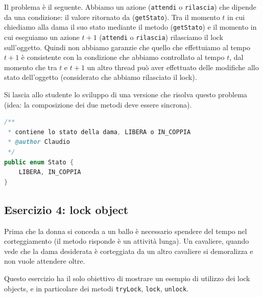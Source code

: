 \documentclass{article}
\begin{document}
Il problema \`e il seguente. Abbiamo un azione (\texttt{attendi} o \texttt{rilascia}) che dipende da una condizione: il valore ritornato da (\texttt{getStato}). Tra il momento $t$ in cui chiediamo alla dama il suo stato mediante il metodo (\texttt{getStato}) e il momento in cui eseguiamo un azione $t+1$ (\texttt{attendi} o \texttt{rilascia})  rilasciamo il lock sull'oggetto. Quindi non abbiamo garanzie che quello che effettuiamo al tempo $t+1$ \`e consistente con la condizione che abbiamo controllato al tempo $t$, dal momento che tra $t$ e $t+1$ un altro thread pu\`o aver effettuato delle modifiche allo stato dell'oggetto (considerato che abbiamo rilasciato il lock).

Si lascia allo studente lo sviluppo di una versione che risolva questo problema (idea: la composizione dei due metodi deve essere sincrona).

\begin{lstlisting}[language=Java]
/**
 * contiene lo stato della dama, LIBERA o IN_COPPIA
 * @author Claudio
 */
public enum Stato {
	LIBERA, IN_COPPIA
}
\end{lstlisting}

\subsection{Esercizio 4: lock object}
\begin{framed}
Prima che la donna si conceda a un ballo \`e necessario spendere del tempo nel corteggiamento (il metodo risponde \`e un attivit\`a lunga). Un cavaliere, quando vede che la dama desiderata \`e corteggiata da un altro cavaliere si demoralizza e non vuole attendere oltre. 
\end{framed}

Questo esercizio ha il solo obiettivo di mostrare un esempio di utilizzo dei lock objects, e in particolare dei metodi \texttt{tryLock}, \texttt{lock}, \texttt{unlock}.
\end{document}
